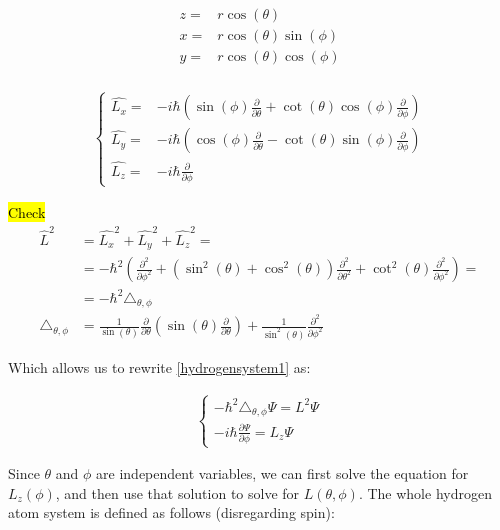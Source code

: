 	\begin{align}
		z =& r \cos(\theta) \\ 
		x =& r \cos(\theta)\sin(\phi) \\ 
		y =& r \cos(\theta)\cos(\phi) \\ 								
	\end{align}
	
	\begin{align}
		\left\{ \begin{aligned}
			\hat{L_x} =& - i\hbar \left(\sin(\phi)\frac{\partial}{\partial \theta} + \cot(\theta)\cos(\phi)\frac{\partial}{\partial \phi}\right) \\
			\hat{L_y} =& - i\hbar \left(\cos(\phi)\frac{\partial}{\partial \theta} - \cot(\theta)\sin(\phi)\frac{\partial}{\partial \phi}\right) \\
			\hat{L_z} =& - i\hbar \frac{\partial}{\partial \phi}
		\end{aligned} \right.
	\end{align}
	
	\hl{Check}
	\begin{align}
		\hat{L}^2 	&= \hat{L_x}^2 + \hat{L_y}^2 + \hat{L_z}^2 = \\
		&= -\hbar^2 \left( \frac{\partial^2}{\partial \phi^2} + \left(\sin^2(\theta) + \cos^2(\theta) \right)\frac{\partial^2}{\partial \theta^2} + \cot^2(\theta) \frac{\partial^2}{\partial \phi^2} \right) = \\
		&= -\hbar^2 \triangle_{\theta, \phi} \\
		\triangle_{\theta, \phi} &= \frac{1}{\sin (\theta)}\frac{\partial}{\partial \theta}\left(\sin(\theta)\frac{\partial}{\partial \theta}\right) + \frac{1}{\sin^2(\theta)}\frac{\partial^2}{\partial \phi ^2}
	\end{align}
	
	Which allows us to rewrite \ref{hydrogensystem1} as:
	
	\begin{align}
		\left\{ \begin{aligned}
			-\hbar^2 \triangle_{\theta, \phi} \Psi = L^2 \Psi \\
			-i\hbar \frac{\partial \Psi}{\partial \phi} = L_z \Psi
		\end{aligned} \right.				
	\end{align}
	
	Since $\theta$ and $\phi$ are independent variables, we can first solve the equation for $L_z(\phi)$, and then use that solution to solve for $L(\theta, \phi)$. The whole hydrogen atom system is defined as follows (disregarding spin):
	
